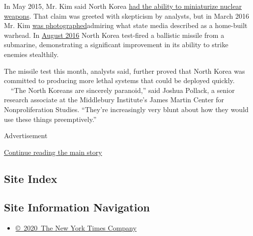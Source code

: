 In May 2015, Mr. Kim said North Korea
\href{https://www.nytimes.com/2015/05/21/world/asia/north-korea-claims-it-has-built-small-nuclear-warheads.html}{had
the ability to miniaturize nuclear weapons}. That claim was greeted with
skepticism by analysts, but in March 2016 Mr. Kim
\href{http://www.bbc.com/news/world-asia-35760797}{was
photographed}admiring what state media described as a home-built
warhead. In
\href{https://www.nytimes.com/2016/08/24/world/asia/north-korea-submarine-missile.html}{August
2016} North Korea test-fired a ballistic missile from a submarine,
demonstrating a significant improvement in its ability to strike enemies
stealthily.

The missile test this month, analysts said, further proved that North
Korea was committed to producing more lethal systems that could be
deployed quickly. ~~``The North Koreans are sincerely paranoid,'' said
Joshua Pollack, a senior research associate at the Middlebury
Institute's James Martin Center for Nonproliferation Studies. ``They're
increasingly very blunt about how they would use these things
preemptively.''

Advertisement

\protect\hyperlink{after-bottom}{Continue reading the main story}

\hypertarget{site-index}{%
\subsection{Site Index}\label{site-index}}

\hypertarget{site-information-navigation}{%
\subsection{Site Information
Navigation}\label{site-information-navigation}}

\begin{itemize}
\tightlist
\item
  \href{https://help.nytimes.com/hc/en-us/articles/115014792127-Copyright-notice}{©~2020~The
  New York Times Company}
\end{itemize}

